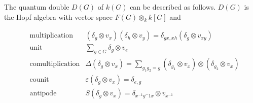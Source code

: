 \begin{example}
    The quantum double $D(G)$ of $k(G)$ can be described as follows. $D(G)$ is
    the Hopf algebra with vector space $F(G) \otimes_k k[G]$ and 

    \begin{align}
        &\text{multiplication} &(\delta_g\otimes v_x) (\delta_h \otimes v_y) = \delta_{gx,xh} (\delta_g \otimes v_{xy})\\
        &\text{unit}           &\sum_{g \in G} \delta_g  \otimes v_e\\
        &\text{comultiplication} &\Delta(\delta_g \otimes v_x) = \sum_{g_1 g_2 = g} (\delta_{g_1} \otimes v_x) \otimes (\delta_{g_2} \otimes v_x) \\
        &\text{counit}           &\varepsilon(\delta_g \otimes v_x) = \delta_{e,g} \\
        &\text{antipode}         &S(\delta_g \otimes v_x) = \delta_{x^{-1}g^-1 x} \otimes v_{x^{-1}}
    \end{align}


\end{example}



